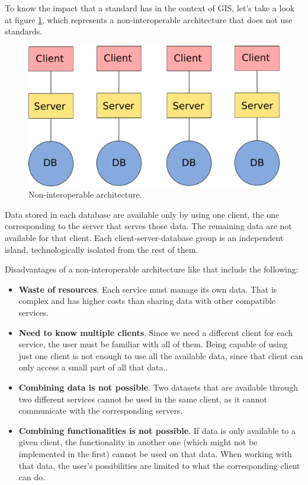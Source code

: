 To know the impact that a standard has in the context of GIS, let's take a look at figure \ref{Fig:Non_interoperable}, which represents a non-interoperable architecture that does not use standards.

\begin{figure}[!hbt]   
\centering
\includegraphics[width=.7\columnwidth]{Software/Non_interoperable.pdf}
\caption{\small Non-interoperable architecture.}
\label{Fig:Non_interoperable} 
\end{figure}

Data stored in each database are available only by using one client, the one corresponding to the server that serves those data. The remaining data are not available for that client. Each client-server-database group is an independent island, technologically isolated from the rest of them.

Disadvantages of a non-interoperable architecture like that include the following:

\begin{itemize}
\item \textbf{Waste of resources}. Each service must manage its own data. That is complex and has higher costs than sharing data with other compatible services.
\item \textbf{Need to know multiple clients}. Since we need a different client for each service, the user must be familiar with all of them. Being capable of using just one client is not enough to use all the available data, since that client can only access a small part of all that data..
\item \textbf{Combining data is not possible}. Two datasets that are available through two different services cannot be used in the same client, as it cannot communicate with the corresponding servers.
\item \textbf{Combining functionalities is not possible}. If data is only available to a given client, the functionality in another one (which might not be implemented in the first) cannot be used on that data. When working with that data, the user's possibilities are limited to what the corresponding client can do.
\end{itemize}

